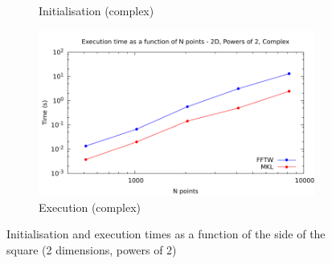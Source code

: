\documentclass[12pt, a4paper]{article} \setlength{\textheight}{24cm}
\begin{document}
\begin{figure}[H]
\begin{subfigure}{.5\textwidth}
    \caption{Initialisation (complex)}
    \label{2DPOW2CI}
  \end{subfigure}%
  \begin{subfigure}{.5\textwidth}
    \centering
    \includegraphics[width=.9\linewidth]{graphs/2d-pow2-exec-c.pdf}
    \caption{Execution (complex)}
    \label{2DPOW2C}
  \end{subfigure}
  \caption{Initialisation and execution times as a function of the
    side of the square (2 dimensions, powers of 2)}
  \label{2DPOW2}
\end{figure}
\end{document}
